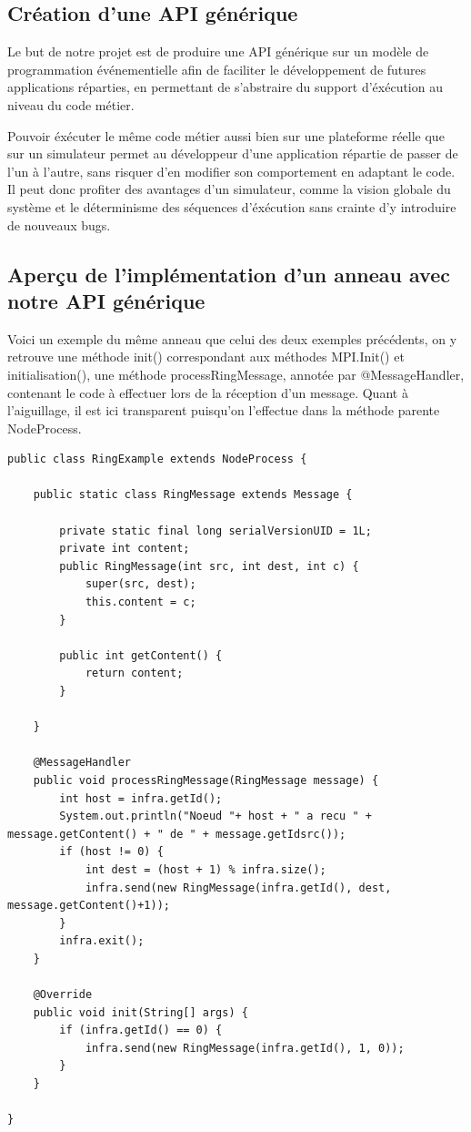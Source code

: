 \documentclass{article}
\begin{document}
		
			\subsection{Création d'une API générique}
				Le but de notre projet est de produire une API générique sur un modèle de programmation événementielle afin de faciliter le développement de futures applications réparties, en permettant de s'abstraire du support d'éxécution au niveau du code métier. \par
Pouvoir éxécuter le même code métier aussi bien sur une plateforme réelle que sur un simulateur permet au développeur d'une application répartie de passer de l'un à l'autre, sans risquer d'en  modifier son comportement en adaptant le code. \newline Il peut donc profiter des avantages d'un simulateur, comme la vision globale du système et le déterminisme des séquences d'éxécution  sans crainte d'y introduire de nouveaux bugs. \par
 
			\newpage
			\subsection{Aperçu de l'implémentation d'un anneau avec notre API générique}
				Voici un exemple du même anneau que celui des deux exemples précédents, on y retrouve une méthode init() correspondant aux méthodes MPI.Init() et initialisation(),
une méthode processRingMessage, annotée par @MessageHandler, contenant le code à effectuer lors de la réception d'un message. Quant à l'aiguillage, il est ici transparent puisqu'on l'effectue dans la méthode parente NodeProcess.
				\begin{lstlisting}
public class RingExample extends NodeProcess {

	public static class RingMessage extends Message {
	
		private static final long serialVersionUID = 1L;
		private int content;
		public RingMessage(int src, int dest, int c) {
			super(src, dest);
			this.content = c;
		}

		public int getContent() {
			return content;
		}

	}

	@MessageHandler
	public void processRingMessage(RingMessage message) {
		int host = infra.getId();
		System.out.println("Noeud "+ host + " a recu " + message.getContent() + " de " + message.getIdsrc());
		if (host != 0) {
			int dest = (host + 1) % infra.size();
			infra.send(new RingMessage(infra.getId(), dest, message.getContent()+1));
		}
		infra.exit();
	}

	@Override
	public void init(String[] args) {
		if (infra.getId() == 0) {
			infra.send(new RingMessage(infra.getId(), 1, 0));
		}
	}

}			
				\end{lstlisting}
				\newpage
				
\end{document}
